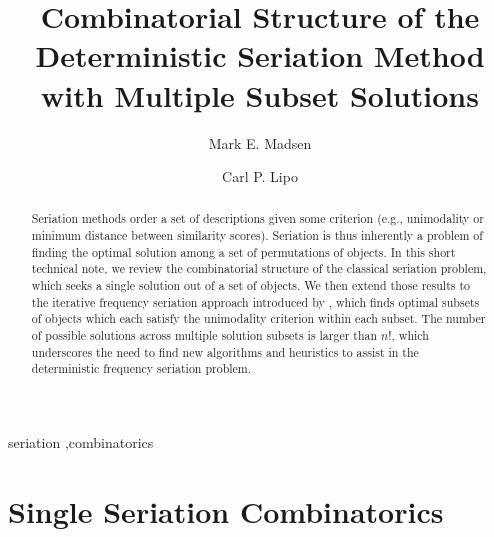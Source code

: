 \documentclass[preprint,times,authoryear,12pt]{els-workingpaper}
\begin{document}
\begin{frontmatter}


\title{Combinatorial Structure of the Deterministic Seriation Method with Multiple Subset Solutions}

\author{Mark E. Madsen}
\address{Department of Anthropology, Box 353100, University of Washington, Seattle WA, 98195 USA}

\author{Carl P. Lipo}
\address{Department of Anthropology and IIRMES, 1250 Bellflower Blvd, California State University at Long Beach, Long Beach CA, 90840 USA}


\begin{abstract}
Seriation methods order a set of descriptions given some criterion (e.g., unimodality or minimum distance between similarity scores).  Seriation is thus inherently a problem of finding the optimal solution among a set of permutations of objects.  In this short technical note, we review the combinatorial structure of the classical seriation problem, which seeks a single solution out of a set of objects.  We then extend those results to the iterative frequency seriation approach introduced by \citet{Lipo1997}, which finds optimal subsets of objects which each satisfy the unimodality criterion within each subset.  The number of possible solutions across multiple solution subsets is larger than $n!$, which underscores the need to find new algorithms and heuristics to assist in the deterministic frequency seriation problem. 
\end{abstract}

\begin{keyword}
seriation \sep combinatorics  
\end{keyword}

\end{frontmatter}





\section{Single Seriation Combinatorics}
\label{sec:single-seriation}


\end{document}
